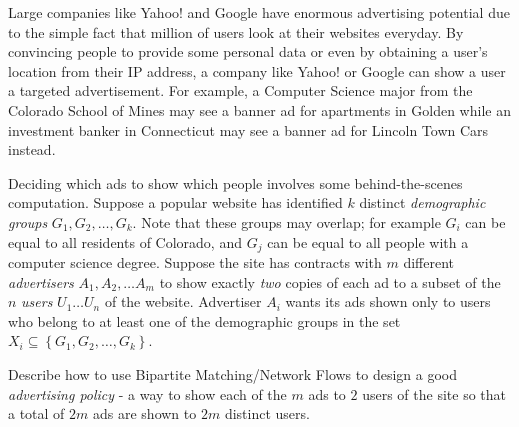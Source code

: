 \documentclass[12pt]{exam}
\newcommand{\stars}[1]{%
    \foreach \n in {1,...,#1}{%
        $\filledstar$%
    }%
}
\begin{document}
\begin{questions}
\begin{parts}
    \end{parts}

\clearpage
\question[35] [W8, \stars{4}]
Large companies like Yahoo! and Google have enormous advertising potential due to the simple fact that million of users look at their websites everyday.  By convincing people to provide some personal data or even by obtaining a user's location from their IP address, a company like Yahoo! or Google can show a user a targeted advertisement.  For example, a Computer Science major from the Colorado School of Mines may see a banner ad for apartments in Golden while an investment banker in Connecticut may see a banner ad for Lincoln Town Cars instead.

   Deciding which ads to show which people involves some behind-the-scenes computation.  Suppose a popular website has identified $k$ distinct \textit{demographic groups} $G_1, G_2, \ldots,G_k$.  Note that these groups may overlap; for example $G_i$ can be equal to all residents of Colorado, and $G_j$ can be equal to all people with a computer science degree.  Suppose the site has contracts with $m$ different \textit{advertisers} $A_1, A_2, \ldots A_m$ to show exactly {\em two} copies of each ad to a subset of the $n$ {\em users} $U_1 \ldots U_n$ of the website.  Advertiser $A_i$ wants its ads shown only to users who belong to at least one of the demographic groups in the set $X_i\subseteq\left\lbrace G_1,G_2,\ldots,G_k\right\rbrace$.

   Describe how to use Bipartite Matching/Network Flows to design a good \textit{advertising policy} - a way to show each of the $m$ ads to $2$ users of the site so that a total of $2m$ ads are shown to $2m$ distinct users.

\end{questions}
\end{document}
